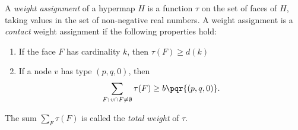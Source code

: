 \begin{definition}
%
  A {\it weight assignment\/} of a hypermap $H$ is a function $\tau$
  on the set of faces of $H$, taking values in the set of non-negative
  real numbers. A weight assignment is a {\it contact} weight
  assignment if the following properties hold:
%
%
%
%
\begin{enumerate}
\item If the face $F$ has cardinality $k$, then
$\tau(F) \ge d(k)$
\item If a node $v$ has type $(p,q,0)$, then
  \begin{displaymath}\sum_{F:\,v\cap F\ne\emptyset} \tau(F) \ge
    b{\pqr{(p,q,0)}}.\end{displaymath}
\end{enumerate}
The sum $\sum_F \tau(F)$ is called the {\it total weight} of $\tau$.
%
\end{definition}



